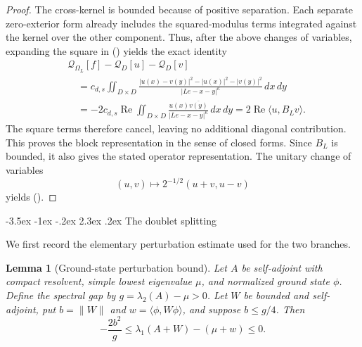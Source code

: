 \documentclass[twoside,10pt]{article}
\makeatletter
\numberwithin{equation}{section}
\theoremstyle{slbody}
\newtheorem{lemma}[theorem]{Lemma}
\theoremstyle{definition}
\newcommand{\ip}[2]{\langle #1,#2\rangle}
\newcommand{\norm}[1]{\lVert #1\rVert}
\newcommand{\abs}[1]{\lvert #1\rvert}
\renewcommand{\section}{%
  \@startsection{section}{1}{\z@}%
    {-3.5ex \@plus -1ex \@minus -.2ex}%
    {2.3ex \@plus .2ex}%
    {\normalfont\large\bfseries}}
\renewcommand{\eqref}[1]{%
  \textup{{\normalfont(\oldstylenums{\ref{#1}}}\normalfont)}}
\makeatother
\begin{document}
\begin{proof}
The cross-kernel is bounded because of positive separation.  Each separate
zero-exterior form already includes the squared-modulus terms integrated
against the kernel over the other component.  Thus, after the above changes
of variables, expanding the square in \eqref{eq:form} yields the exact identity
\begin{align*}
 &\mathcal{Q}_{\Omega_L}[f]-\mathcal{Q}_D[u]-\mathcal{Q}_D[v]\\
 &\quad=c_{d,s}\iint_{D\times D}
 \frac{\abs{u(x)-v(y)}^2-\abs{u(x)}^2-\abs{v(y)}^2}
 {\abs{Le-x-y}^{\kappa}}\,dx\,dy\\
 &\quad=-2c_{d,s}\operatorname{Re}\iint_{D\times D}
 \frac{u(x)\overline{v(y)}}{\abs{Le-x-y}^{\kappa}}\,dx\,dy
 =2\operatorname{Re}\ip{u}{B_Lv}.
\end{align*}
The square terms therefore cancel, leaving no additional diagonal
contribution.  This proves the block representation in the sense of closed forms.  Since
$B_L$ is bounded, it also gives the stated operator representation.  The
unitary change of variables
\[
 (u,v)\longmapsto 2^{-1/2}(u+v,u-v)
\]
yields \eqref{eq:direct-sum}.
\end{proof}

\section{The doublet splitting}

We first record the elementary perturbation estimate used for the two
branches.

\begin{lemma}[Ground-state perturbation bound]\label{lem:perturb}
Let $A$ be self-adjoint with compact resolvent, simple lowest eigenvalue
$\mu$, and normalized ground state $\phi$.  Define the spectral gap by
$g=\lambda_2(A)-\mu>0$.  Let $W$ be bounded and self-adjoint, put
$b=\norm{W}$ and
$w=\ip{\phi}{W\phi}$, and suppose $b\leq g/4$.  Then
\begin{equation}\label{eq:perturb}
 -\frac{2b^2}{g}
 \leq \lambda_1(A+W)-(\mu+w)\leq0.
\end{equation}
\end{lemma}
\end{document}
